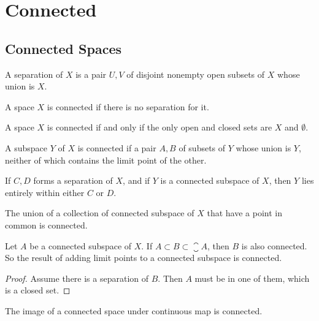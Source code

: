\chapter{Connected}

\section{Connected Spaces}

\begin{definition}
    A separation of $X$ is a pair $U,V$ of disjoint nonempty open subsets of $X$ whose union is $X$.
\end{definition}

\begin{definition}
    A space $X$ is connected if there is no separation for it.
\end{definition}

\begin{theorem}
    A space $X$ is connected if and only if the only open and closed sets are $X$ and $\emptyset$.
\end{theorem}

\begin{theorem}
    A subspace $Y$ of $X$ is connected if a pair $A,B$ of subsets of $Y$ whose union is $Y$, neither of which contains the limit point of the other.    
\end{theorem}

\begin{theorem}
    If $C,D$ forms a separation of $X$, and if $Y$ is a connected subspace of $X$, then $Y$ lies entirely within either $C$ or $D$.
\end{theorem}

\begin{theorem}
The union of a collection of connected subspace of $X$ that have a point in common is connected.    
\end{theorem}

\begin{theorem}
Let $A$ be a connected subspace of $X$. If $A \subset B \subset \closure{A}$, then $B$ is also connected. So the result of adding limit points to a connected subspace is connected.
\end{theorem}
\begin{proof}
    Assume there is a separation of $B$. Then $A$ must be in one of them, which is a closed set.
\end{proof}

\begin{theorem}
The image of a connected space under continuous map is connected.    
\end{theorem}


